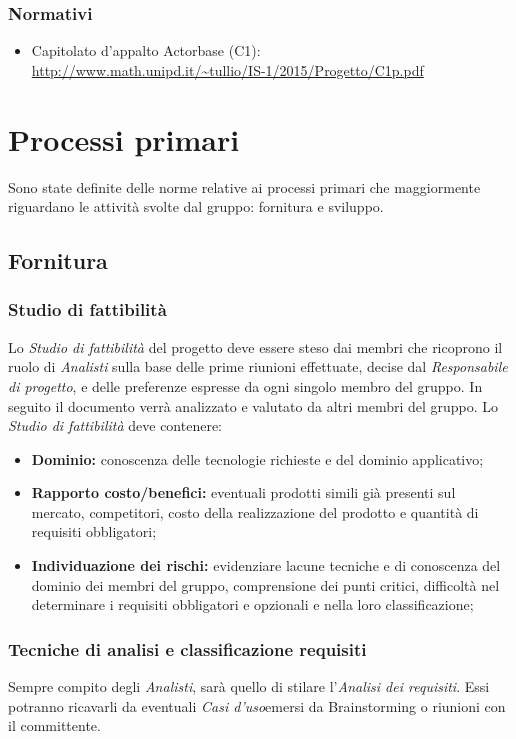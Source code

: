 \documentclass[a4paper]{article}
\newcommand{\UC}{\emph{Casi d'uso}\space}
\begin{document}
			\subsubsection{Normativi}
				\begin{itemize}
					\item Capitolato d'appalto Actorbase (C1): \\
					\url{http://www.math.unipd.it/~tullio/IS-1/2015/Progetto/C1p.pdf}
				\end{itemize}

	\newpage
	\section{Processi primari}
		Sono state definite delle norme relative ai processi primari che maggiormente riguardano le attività
		svolte dal gruppo: fornitura e sviluppo.
		\subsection{Fornitura}
		\subsubsection{Studio di fattibilità}
		Lo \emph{Studio di fattibilità} del progetto deve essere steso dai membri che ricoprono il ruolo di 
		\emph{Analisti} sulla base delle prime riunioni effettuate, decise dal \emph{Responsabile di progetto},
		e delle preferenze espresse da ogni singolo membro del gruppo.
		In seguito il documento verrà analizzato e valutato da altri membri del gruppo. 
		Lo \emph{Studio di fattibilità} deve contenere:
		\begin{itemize}
			\item \textbf{Dominio:} conoscenza delle tecnologie richieste e del dominio applicativo;
			\item \textbf{Rapporto costo/benefici:} eventuali prodotti simili già presenti sul mercato,
			competitori, costo della
			realizzazione del prodotto e quantità di requisiti obbligatori;
			\item \textbf{Individuazione dei rischi:} evidenziare lacune tecniche e di conoscenza del dominio
			dei membri del gruppo, comprensione
			dei punti critici, difficoltà nel determinare i requisiti obbligatori e opzionali e nella loro
			classificazione;
		\end{itemize}
		\subsubsection{Tecniche di analisi e classificazione requisiti}
		Sempre compito degli \emph{Analisti}, sarà quello di stilare l'\emph{Analisi dei requisiti}. Essi potranno ricavarli
		da eventuali \UC emersi da Brainstorming o riunioni con il committente.
\end{document}
